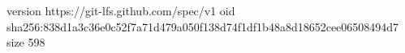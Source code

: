 version https://git-lfs.github.com/spec/v1
oid sha256:838d1a3c36e0c52f7a71d479a050f138d74f1df1b48a8d18652cee06508494d7
size 598
